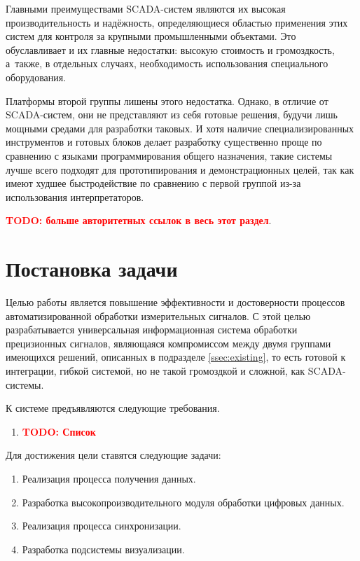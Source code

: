 \documentclass[a4paper, 14pt, titlepage]{extarticle}
\newcommand{\todo}[1]{\textbf{\textcolor{red}{TODO: #1}}}
\let\oldsection\section
\renewcommand{\section}{\newpage\oldsection}
\begin{document}
  Главными преимуществами SCADA-систем являются их высокая производительность и надёжность,
  определяющиеся областью применения этих систем для контроля за крупными промышленными объектами.
  Это обуславливает и их главные недостатки: высокую стоимость и громоздкость, а~также, в отдельных
  случаях, необходимость использования специального оборудования.

  Платформы второй группы лишены этого недостатка. Однако, в отличие от SCADA-систем, они не
  представляют из себя готовые решения, будучи лишь мощными средами для разработки таковых.
  И хотя наличие специализированных инструментов и готовых блоков делает разработку существенно
  проще по сравнению с языками программирования общего назначения, такие системы лучше всего
  подходят для прототипирования и демонстрационных целей, так как имеют худшее быстродействие по
  сравнению с первой группой из-за использования интерпретаторов.

  \todo{больше авторитетных ссылок в весь этот раздел}.

  \section{Постановка задачи}

  Целью работы является повышение эффективности и достоверности процессов автоматизированной
  обработки измерительных сигналов. С этой целью разрабатывается универсальная информационная
  система обработки прецизионных сигналов, %
  являющаяся компромиссом между двумя группами имеющихся решений, описанных в подразделе
  \ref{ssec:existing}, то есть готовой к интеграции, гибкой системой, но не такой громоздкой и
  сложной, как SCADA-системы.

  К системе предъявляются следующие требования.
  \begin{enumerate}
    \item \todo{Список}
  \end{enumerate}

  Для достижения цели ставятся следующие задачи:
  \begin{enumerate}
    \item Реализация процесса получения данных.
    \item Разработка высокопроизводительного модуля обработки цифровых данных.
    \item Реализация процесса синхронизации.
    \item Разработка подсистемы визуализации.
  \end{enumerate}

  \begin{flushleft}
    
    
  \end{flushleft}
\end{document}
